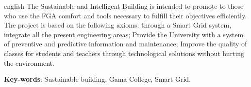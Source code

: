 \begin{resumo}[Abstract]
 \begin{otherlanguage*}{english}
 The Sustainable and Intelligent Building is intended to promote to those who use the FGA comfort and tools necessary to fulfill their objectives efficiently. The project is based on the following axioms: through a Smart Grid system, integrate all the present engineering areas; Provide the University with a system of preventive and predictive information and maintenance; Improve the quality of classes for students and teachers through technological solutions without hurting the environment.

   \vspace{\onelineskip}
 
   \noindent 
   \textbf{Key-words}: Sustainable building, Gama College, Smart Grid. 
 \end{otherlanguage*}
\end{resumo}
